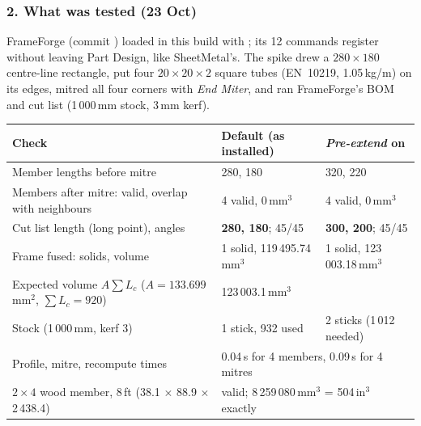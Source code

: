 \subsubsection*{2. What was tested (23 Oct)}

FrameForge (commit ) loaded in this build with ; its 12 commands register without leaving Part
Design, like SheetMetal's. The spike drew a $280\times180$ centre-line rectangle, put four $20\times20\times2$ square
tubes (EN~10219, 1.05\,kg/m) on its edges, mitred all four corners with \emph{End Miter}, and ran FrameForge's BOM and
cut list (1\,000\,mm stock, 3\,mm kerf).
\begin{center}
\small
\begin{tabularx}{\linewidth}{@{}Xll@{}}
\toprule
Check & Default (as installed) & \emph{Pre-extend} on\\
\midrule
Member lengths before mitre & 280, 180 & 320, 220\\
Members after mitre: valid, overlap with neighbours & 4 valid, 0\,mm$^3$ & 4 valid, 0\,mm$^3$\\
Cut list length (long point), angles & \textbf{280, 180}; 45/45 & \textbf{300, 200}; 45/45\\
Frame fused: solids, volume & 1 solid, 119\,495.74\,mm$^3$ & 1 solid, 123\,003.18\,mm$^3$\\
Expected volume $A\sum L_c$ ($A=133.699$\,mm$^2$, $\sum L_c = 920$) & \multicolumn{2}{l}{123\,003.1\,mm$^3$}\\
Stock (1\,000\,mm, kerf 3) & 1 stick, 932 used & 2 sticks (1\,012 needed)\\
Profile, mitre, recompute times & \multicolumn{2}{l}{0.04\,s for 4 members, 0.09\,s for 4 mitres}\\
$2\times4$ wood member, 8\,ft (38.1 $\times$ 88.9 $\times$ 2\,438.4) & \multicolumn{2}{l}{valid; 8\,259\,080\,mm$^3$ = 504\,in$^3$ exactly}\\
\bottomrule
\end{tabularx}
\end{center}

